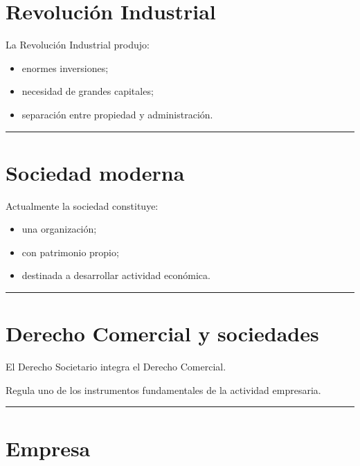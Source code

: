 \documentclass[
  spanish,
  letterpaper,
  DIV=11,
  numbers=noendperiod]{scrartcl}
\providecommand{\tightlist}{%
  \setlength{\itemsep}{0pt}\setlength{\parskip}{0pt}}
\begin{document}
\section{Revolución Industrial}\label{revoluciuxf3n-industrial}

La Revolución Industrial produjo:

\begin{itemize}
\tightlist
\item
  enormes inversiones;
\item
  necesidad de grandes capitales;
\item
  separación entre propiedad y administración.
\end{itemize}

\begin{center}\rule{0.5\linewidth}{0.5pt}\end{center}

\section{Sociedad moderna}\label{sociedad-moderna}

Actualmente la sociedad constituye:

\begin{itemize}
\tightlist
\item
  una organización;
\item
  con patrimonio propio;
\item
  destinada a desarrollar actividad económica.
\end{itemize}

\begin{center}\rule{0.5\linewidth}{0.5pt}\end{center}

\section{Derecho Comercial y
sociedades}\label{derecho-comercial-y-sociedades}

El Derecho Societario integra el Derecho Comercial.

Regula uno de los instrumentos fundamentales de la actividad empresaria.

\begin{center}\rule{0.5\linewidth}{0.5pt}\end{center}

\section{Empresa}\label{empresa}
\end{document}

